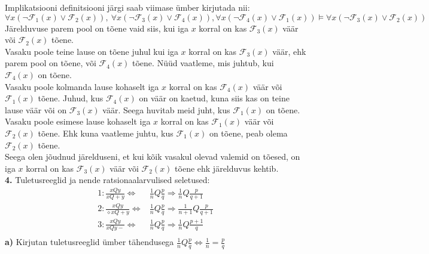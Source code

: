 \documentclass{article}
\begin{document}
Implikatsiooni definitsiooni j\"argi saab viimase \"umber kirjutada nii:\\
$\forall x(\neg\mathcal{F}_1(x)\vee \mathcal{F}_2(x)),\ \forall x(\neg\mathcal{F}_3(x)\vee \mathcal{F}_4(x)), \forall x(\neg\mathcal{F}_4(x)\vee \mathcal{F}_1(x))\models\forall x(\neg\mathcal{F}_3(x)\vee \mathcal{F}_2(x))$\\
J\"arelduvuse parem pool on t\~oene vaid siis, kui iga $x$ korral on kas $\mathcal{F}_3(x)$ v\"a\"ar v\~oi $\mathcal{F}_2(x)$ t\~oene.\\
Vasaku poole teine lause on t\~oene juhul kui iga $x$ korral on kas $\mathcal{F}_3(x)$ v\"a\"ar, ehk parem pool on t\~oene, v\~oi $\mathcal{F}_4(x)$ t\~oene. N\"u\"ud vaatleme, mis juhtub, kui $\mathcal{F}_4(x)$ on t\~oene.\\
Vasaku poole kolmanda lause kohaselt iga $x$ korral on kas $\mathcal{F}_4(x)$ v\"a\"ar v\~oi $\mathcal{F}_1(x)$ t\~oene. Juhud, kus $\mathcal{F}_4(x)$ on v\"a\"ar on kaetud, kuna siis kas on teine lause v\"a\"ar v\~oi on $\mathcal{F}_3(x)$ v\"a\"ar. Seega huvitab meid juht, kus $\mathcal{F}_1(x)$ on t\~oene.\\
Vasaku poole esimese lause kohaselt iga $x$ korral on kas $\mathcal{F}_1(x)$ v\"a\"ar v\~oi $\mathcal{F}_2(x)$ t\~oene. Ehk kuna vaatleme juhtu, kus $\mathcal{F}_1(x)$ on t\~oene, peab olema $\mathcal{F}_2(x)$ t\~oene.\\
Seega olen j\~oudnud j\"arelduseni, et kui k\~oik vasakul olevad valemid on t\~oesed, on iga $x$ korral on kas $\mathcal{F}_3(x)$ v\"a\"ar v\~oi $\mathcal{F}_2(x)$ t\~oene ehk j\"arelduvus kehtib.
\pagebreak\\
\textbf{4.} Tuletusreeglid ja nende ratsionaalarvulised seletused:\\
\begin{equation*}
\begin{aligned}
1: \frac{xQy}{xQ+y}\iff& \frac{1}{n}Q\frac{p}{q}\Rightarrow\frac{1}{n}Q\frac{p}{q+1}\\
2: \frac{xQy}{\diamond xQ+y}\iff& \frac{1}{n}Q\frac{p}{q}\Rightarrow\frac{1}{n+1}Q\frac{p}{q+1}\\
3: \frac{xQy}{xQy-}\iff& \frac{1}{n}Q\frac{p}{q}\Rightarrow\frac{1}{n}Q\frac{p+1}{q}\\
\end{aligned}
\end{equation*}
\textbf{a)} Kirjutan tuletusreeglid \"umber t\"ahendusega $\frac{1}{n}Q\frac{p}{q}\Leftrightarrow\frac{1}{n}=\frac{p}{q}$ \\
\end{document}
